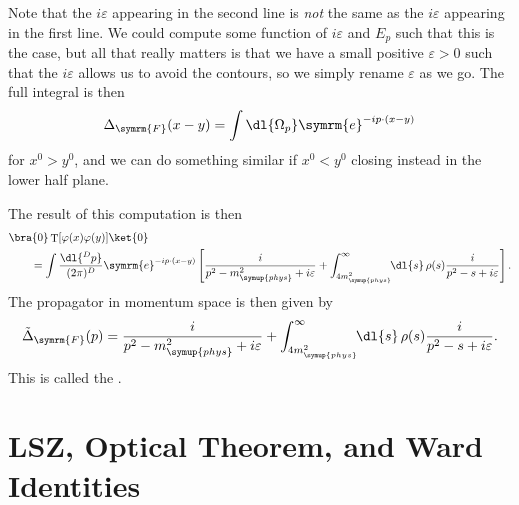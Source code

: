 \documentclass[fleqn]{NotesClass}
\newcommand{\e}{\symrm{e}}
\DeclareMathOperator{\timeOrdering}{T}
\newcommand{\feynman}{\symrm{F}}
\newcommand{\phys}{\symup{phys}}
\begin{document}
    Note that the \(i\varepsilon\) appearing in the second line is \emph{not} the same as the \(i\varepsilon\) appearing in the first line.
    We could compute some function of \(i\varepsilon\) and \(E_p\) such that this is the case, but all that really matters is that we have a small positive \(\varepsilon > 0\) such that the \(i\varepsilon\) allows us to avoid the contours, so we simply rename \(\varepsilon\) as we go.
    The full integral is then
    \begin{equation}
        \Delta_{\feynman}(x - y) = \int \dl{\Omega_p} \e^{-ip \cdot (x - y)}
    \end{equation}
    for \(x^0 > y^0\), and we can do something similar if \(x^0 < y^0\) closing instead in the lower half plane.
    
    The result of this computation is then
    \begin{align}
        &\bra{0} \timeOrdering[\varphi(x)\varphi(y)] \ket{0}\\
        &\qquad = \int \frac{\dl{^Dp}}{(2\pi)^D} \e^{-ip\cdot(x - y)} \left[ \frac{i}{p^2 - m_{\phys}^2 + i\varepsilon} + \int_{4m_{\phys}^2}^{\infty} \!\! \dl{s} \, \rho(s) \frac{i}{p^2 - s + i\varepsilon} \right]. \notag
    \end{align}
    The propagator in momentum space is then given by
    \begin{equation}\label{eqn:kallen-lehmann representation}
        \tilde{\Delta}_{\feynman}(p) = \frac{i}{p^2 - m_{\phys}^2 + i\varepsilon} + \int_{4m_{\phys}^2}^{\infty} \!\! \dl{s} \, \rho(s) \frac{i}{p^2 - s + i\varepsilon}.
    \end{equation}
    This is called the .
    
    \chapter{LSZ, Optical Theorem, and Ward Identities}
\end{document}
